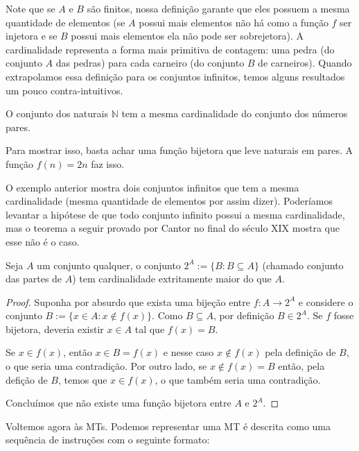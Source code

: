 
Note que se $A$ e $B$ são finitos, nossa definição garante que eles possuem a mesma quantidade de elementos (se $A$ possui mais elementos não há como a função $f$ ser injetora e se $B$ possui mais elementos ela não pode ser sobrejetora).
A cardinalidade representa a forma mais primitiva de contagem: uma pedra (do conjunto $A$ das pedras) para cada carneiro (do conjunto $B$ de carneiros).
Quando extrapolamos essa definição para os conjuntos infinitos, temos alguns resultados um pouco contra-intuitivos.

\begin{example}
  O conjunto dos naturais $\mathbb{N}$ tem a mesma cardinalidade do conjunto dos números pares.
  
  Para mostrar isso, basta achar uma função bijetora que leve naturais em pares.
  A função $f(n) = 2n$ faz isso.
\end{example}

O exemplo anterior mostra dois conjuntos infinitos que tem a mesma cardinalidade (mesma quantidade de elementos por assim dizer).
Poderíamos levantar a hipótese de que todo conjunto infinito possui a mesma cardinalidade, mas o teorema a seguir provado por Cantor no final do século XIX mostra que esse não é o caso.

\begin{theorem}[Cantor]
  Seja $A$ um conjunto qualquer, o conjunto $2^A := \{B : B \subseteq A\}$ (chamado conjunto das partes de $A$) tem cardinalidade extritamente maior do que $A$.
\end{theorem}
\begin{proof}
  Suponha por absurdo que exista uma bijeção entre $f: A \to 2^A$ e considere o conjunto $B := \{x \in A : x \notin f(x)\}$.
  Como $B \subseteq A$, por definição $B \in 2^A$.
  Se $f$ fosse bijetora, deveria existir $x \in A$ tal que $f(x) = B$.

  Se $x \in f(x)$, então $x \in B = f(x)$ e nesse caso $x \notin f(x)$ pela definição de $B$, o que seria uma contradição.
  Por outro lado, se $x \notin f(x) = B$ então, pela defição de $B$, temos que $x \in f(x)$, o que também seria uma contradição.

  Concluímos que não existe uma função bijetora entre $A$ e $2^A$.
\end{proof}

Voltemos agora às MTs.
Podemos representar uma MT é descrita como uma sequência de instruções com o seguinte formato:

